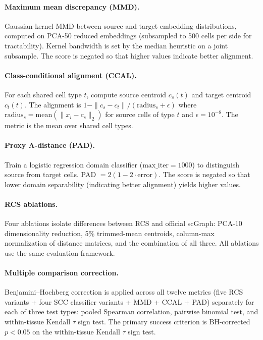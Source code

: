 \documentclass[11pt]{article}
\begin{document}
\paragraph{Maximum mean discrepancy (MMD).} Gaussian-kernel MMD between
source and target embedding distributions, computed on PCA-50 reduced
embeddings (subsampled to 500 cells per side for tractability). Kernel
bandwidth is set by the median heuristic on a joint subsample. The score
is negated so that higher values indicate better alignment.

\paragraph{Class-conditional alignment (CCAL).} For each shared cell
type $t$, compute source centroid $c_s(t)$ and target centroid $c_t(t)$.
The alignment is $1 - \|c_s - c_t\| / (\text{radius}_s + \epsilon)$
where $\text{radius}_s = \text{mean}(\|x_i - c_s\|_2)$ for source cells
of type $t$ and $\epsilon = 10^{-8}$. The metric is the mean over shared
cell types.

\paragraph{Proxy A-distance (PAD).} Train a logistic regression domain
classifier ($\text{max\_iter} = 1000$) to distinguish source from target
cells. PAD $= 2(1 - 2 \cdot \text{error})$. The score is negated so
that lower domain separability (indicating better alignment) yields
higher values.

\paragraph{RCS ablations.} Four ablations isolate differences between
RCS and official scGraph: PCA-10 dimensionality reduction, 5\% trimmed-mean
centroids, column-max normalization of distance matrices, and the
combination of all three. All ablations use the same evaluation
framework.

\paragraph{Multiple comparison correction.} Benjamini--Hochberg
correction is applied across all twelve metrics (five RCS variants +
four SCC classifier variants + MMD + CCAL + PAD) separately for each of
three test types: pooled Spearman correlation, pairwise binomial test,
and within-tissue Kendall $\tau$ sign test. The primary success criterion
is BH-corrected $p < 0.05$ on the within-tissue Kendall $\tau$ sign
test.
\end{document}
